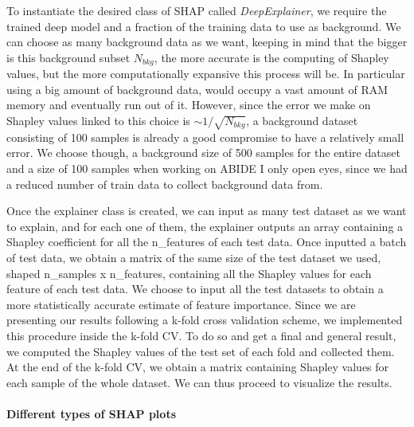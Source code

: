 \documentclass[11pt]{report}
\begin{document}
\noindent To instantiate the desired class of SHAP called \emph{DeepExplainer}, we require the trained deep model and a fraction of the training data to use as background.
We can choose as many background data as we want, keeping in mind that the bigger is this background subset $N_{bkg}$, the more accurate is the computing of Shapley values, but the more computationally expansive this process will be.
In particular using a big amount of background data, would occupy a vast amount of RAM memory and eventually run out of it.
However, since the error we make on Shapley values linked to this choice is $\sim 1/\sqrt{N_{bkg}}$, a background dataset consisting of 100 samples is already a good compromise to have a relatively small error.
We choose though, a background size of 500 samples for the entire dataset and a size of 100 samples when working on ABIDE I only open eyes, since we had a reduced number of train data to collect background data from.

Once the explainer class is created, we can input as many test dataset as we want to explain, and for each one of them, the explainer outputs an array containing a Shapley coefficient for all the n\_features of each test data.
Once inputted a batch of test data, we obtain a matrix of the same size of the test dataset we used, shaped n\_samples x n\_features, containing all the Shapley values for each feature of each test data.
We choose to input all the test datasets to obtain a more statistically accurate estimate of feature importance.
Since we are presenting our results following a k-fold cross validation scheme, we implemented this procedure inside the k-fold CV.
To do so and get a final and general result, we computed the Shapley values of the test set of each fold and collected them. At the end of the k-fold CV, we obtain a matrix containing Shapley values for each sample of the whole dataset.
We can thus proceed to visualize the results.

\paragraph{Different types of SHAP plots} \hfill
\end{document}
